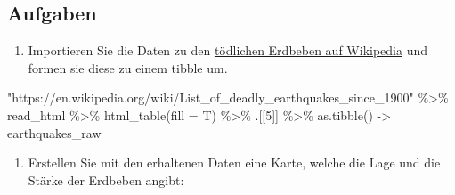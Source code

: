 \documentclass[
  ngerman,
]{article}
\newenvironment{Shaded}{\begin{snugshade}}{\end{snugshade}}
\newcommand{\AttributeTok}[1]{\textcolor[rgb]{0.77,0.63,0.00}{#1}}
\newcommand{\DecValTok}[1]{\textcolor[rgb]{0.00,0.00,0.81}{#1}}
\newcommand{\FunctionTok}[1]{\textcolor[rgb]{0.00,0.00,0.00}{#1}}
\newcommand{\NormalTok}[1]{#1}
\newcommand{\OtherTok}[1]{\textcolor[rgb]{0.56,0.35,0.01}{#1}}
\newcommand{\SpecialCharTok}[1]{\textcolor[rgb]{0.00,0.00,0.00}{#1}}
\newcommand{\StringTok}[1]{\textcolor[rgb]{0.31,0.60,0.02}{#1}}
\providecommand{\tightlist}{%
  \setlength{\itemsep}{0pt}\setlength{\parskip}{0pt}}
\begin{document}
\hypertarget{aufgaben-5}{%
\subsection{Aufgaben}\label{aufgaben-5}}

\begin{enumerate}
\def\labelenumi{\arabic{enumi}.}
\tightlist
\item
  Importieren Sie die Daten zu den \href{https://en.wikipedia.org/wiki/List_of_deadly_earthquakes_since_1900}{tödlichen Erdbeben auf Wikipedia}
  und formen sie diese zu einem tibble um.
\end{enumerate}

\begin{Shaded}
\begin{Highlighting}[]
\StringTok{"https://en.wikipedia.org/wiki/List\_of\_deadly\_earthquakes\_since\_1900"} \SpecialCharTok{\%\textgreater{}\%}
\NormalTok{  read\_html }\SpecialCharTok{\%\textgreater{}\%}
  \FunctionTok{html\_table}\NormalTok{(}\AttributeTok{fill =}\NormalTok{ T) }\SpecialCharTok{\%\textgreater{}\%}
\NormalTok{  .[[}\DecValTok{5}\NormalTok{]] }\SpecialCharTok{\%\textgreater{}\%}
  \FunctionTok{as.tibble}\NormalTok{() }\OtherTok{{-}\textgreater{}}\NormalTok{ earthquakes\_raw}
\end{Highlighting}
\end{Shaded}

\begin{enumerate}
\def\labelenumi{\arabic{enumi}.}
\setcounter{enumi}{1}
\tightlist
\item
  Erstellen Sie mit den erhaltenen Daten eine Karte, welche die Lage und die Stärke der Erdbeben angibt:
\end{enumerate}
\end{document}
